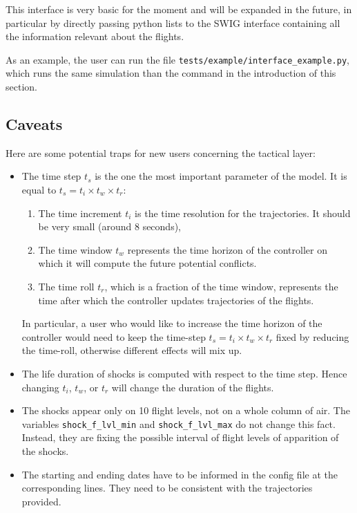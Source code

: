 \documentclass[12pt]{article}
\begin{document}
This interface is very basic for the moment and will be expanded in the future, in particular by directly passing python lists to the SWIG interface containing all the information relevant about the flights.

As an example, the user can run the file \verb|tests/example/interface_example.py|, which runs the same simulation than the command in the introduction of this section.

\subsection{Caveats}
\label{subsec:caveats}

Here are some potential traps for new users concerning the tactical layer:
\begin{itemize}
\item The time step $t_s$ is the one the most important parameter of the model. It is equal to $t_s = t_i \times t_w\times t_r$:
\begin{enumerate}
\item The time increment $t_i$ is the time resolution for the trajectories. It should be very small (around 8 seconds),
\item The time window $t_w$ represents the time horizon of the controller on which it will compute the future potential conflicts.
\item The time roll $t_r$, which is a fraction of the time window, represents the time after which the controller updates trajectories of the flights.
\end{enumerate}
In particular, a user who would like to increase the time horizon of the controller would need to keep the time-step $t_s = t_i \times t_w\times t_r$ fixed by reducing the time-roll, otherwise different effects will mix up.
\item The life duration of shocks is computed with respect to the time step. Hence changing $t_i$, $t_w$, or $t_r$ will change the duration of the flights.
\item The shocks appear only on 10 flight levels, not on a whole column of air. The variables \verb|shock_f_lvl_min| and \verb|shock_f_lvl_max| do not change this fact. Instead, they are fixing the possible interval of flight levels of apparition of the shocks.
\item The starting and ending dates have to be informed in the config file at the corresponding lines. They need to be consistent with the trajectories provided. 
\end{itemize}
\end{document}
